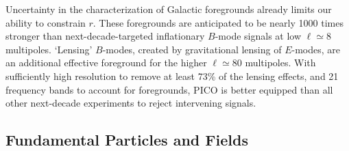 \documentclass[PICOAPC.tex]{subfiles}
\begin{document}


Uncertainty in the characterization of Galactic foregrounds already limits our ability to constrain $r$. These foregrounds 
are anticipated to be nearly 1000 times stronger than next-decade-targeted inflationary $B$-mode signals at low $\ell \simeq 8$ multipoles. `Lensing' $B$-modes, created by gravitational lensing of $E$-modes, are an additional effective foreground for the higher $\ell \simeq 80$ multipoles. With sufficiently high resolution to remove at least 73\% of the lensing effects, and 21 frequency bands to account for foregrounds, PICO is better equipped than all other next-decade experiments to reject intervening signals. 

\vspace{-0.06in}

\subsection{Fundamental Particles and Fields} %
\label{sec:relics_neutrinos}

\end{document}
